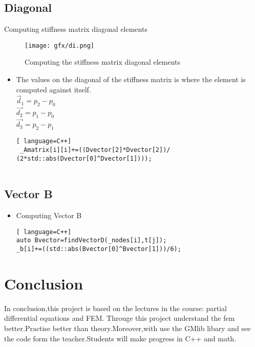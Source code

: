 \documentclass[a4,10pt]{article}
\begin{document}
\subsection*{Diagonal}

 Computing stiffness matrix diagonal elements
\begin{figure}[H]
      \centering
      \texttt{[image: gfx/di.png]}

      \caption{Computing the stiffness matrix diagonal elements\cite{IEEEhowto:kopka}}
      \label{fig:TriangleFacets}
    \end{figure}
\begin{itemize}
\item The values on the diagonal of the stiffness matrix is where the element is computed against itself.
\\
$\overrightarrow{d}_{1}=p_{2}-p_{0}$\vspace{5pt}\\
$\overrightarrow{{d}_{2}}=p_{1}-p_{0}$\vspace{5pt}\\
$\overrightarrow{{d}_{3}}=p_{2}-p_{1}$\vspace{5pt}\\
 
\begin{lstlisting}[ language=C++] 
 _Amatrix[i][i]+=((Dvector[2]*Dvector[2])/
(2*std::abs(Dvector[0]^Dvector[1])));
                   
\end{lstlisting} 
\end{itemize}
\subsection*{Vector B}
\begin{itemize}
\item Computing Vector B
\begin{lstlisting}[ language=C++] 
auto Bvector=findVectorD(_nodes[i],t[j]);
_b[i]+=((std::abs(Bvector[0]^Bvector[1]))/6);
\end{lstlisting} 
    \end{itemize}

  \section{Conclusion}
    In conclusion,this project is  based on the lectures in the course: partial differential equations and FEM.
Througe this project understand the fem better.Practise better than theory.Moreover,with use the 
GMlib libary and see the code form the teacher.Students will make progress in C++ and math.
  
\end{document}
